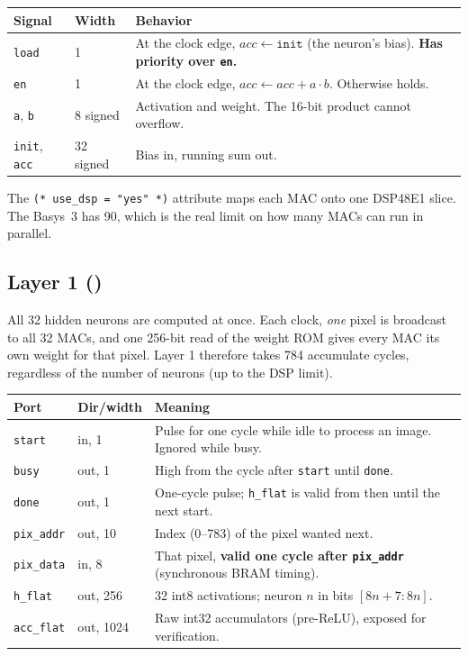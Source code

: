 \documentclass[11pt]{article}
\begin{document}
\begin{center}
\begin{tabularx}{\linewidth}{@{}llX@{}}
\toprule
Signal & Width & Behavior \\
\midrule
\texttt{load} & 1 & At the clock edge, $\mathit{acc} \leftarrow \texttt{init}$ (the neuron's bias). \textbf{Has priority over \texttt{en}.} \\
\texttt{en}   & 1 & At the clock edge, $\mathit{acc} \leftarrow \mathit{acc} + a\cdot b$. Otherwise holds. \\
\texttt{a}, \texttt{b} & 8 signed & Activation and weight. The 16-bit product cannot overflow. \\
\texttt{init}, \texttt{acc} & 32 signed & Bias in, running sum out. \\
\bottomrule
\end{tabularx}
\end{center}

The \texttt{(* use\_dsp = "yes" *)} attribute maps each MAC onto one DSP48E1 slice.
The Basys~3 has 90, which is the real limit on how many MACs can run in parallel.

\subsection{Layer 1 ()}
All 32 hidden neurons are computed at once. Each clock, \emph{one} pixel is
broadcast to all 32 MACs, and one 256-bit read of the weight ROM gives every MAC
its own weight for that pixel. Layer 1 therefore takes 784 accumulate cycles,
regardless of the number of neurons (up to the DSP limit).

\begin{center}
\begin{tabularx}{\linewidth}{@{}llX@{}}
\toprule
Port & Dir/width & Meaning \\
\midrule
\texttt{start}    & in, 1   & Pulse for one cycle while idle to process an image. Ignored while busy. \\
\texttt{busy}     & out, 1  & High from the cycle after \texttt{start} until \texttt{done}. \\
\texttt{done}     & out, 1  & One-cycle pulse; \texttt{h\_flat} is valid from then until the next start. \\
\texttt{pix\_addr}& out, 10 & Index (0--783) of the pixel wanted next. \\
\texttt{pix\_data}& in, 8   & That pixel, \textbf{valid one cycle after \texttt{pix\_addr}} (synchronous BRAM timing). \\
\texttt{h\_flat}  & out, 256& 32 int8 activations; neuron $n$ in bits $[8n{+}7{:}8n]$. \\
\texttt{acc\_flat}& out, 1024& Raw int32 accumulators (pre-ReLU), exposed for verification. \\
\bottomrule
\end{tabularx}
\end{center}
\end{document}
